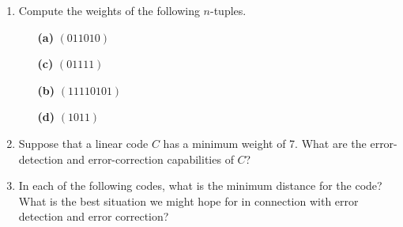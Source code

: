 {\begin{enumerate}
\begin{minipage}[t]{4.6in}
\begin{minipage}[t]{2.25in}
\begin{itemize}
 
\end{itemize}
\end{minipage}
\end{minipage}
 
\vspace{2pt}        %
 
 
 
 
\bf\item\rm  %
Compute the weights of the following $n$-tuples.
 
\vspace{3pt}        %
 
\hspace{-7pt}
\begin{minipage}[t]{4.6in}
\noindent
\begin{minipage}[t]{2.25in}
\begin{itemize}
 
 \item[{\bf (a)}]
$(011010)$
 
 \item[{\bf (c)}]
$(01111)$
 
\end{itemize}
\end{minipage} \hfill
\begin{minipage}[t]{2.25in}
\begin{itemize}
 
 \item[{\bf (b)}]
$(11110101)$
 
 \item[{\bf (d)}]
$(1011)$
 
\end{itemize}
\end{minipage}
\end{minipage}
 
\vspace{2pt}        %
 
 
 
\bf\item\rm  %
Suppose that a linear code $C$ has a minimum weight of 7. What are the
error-detection and error-correction capabilities of $C$?
 
 
\bf\item\rm
In each of the following codes, what is the minimum distance for the
code? What is the best situation we might hope for in connection with
error detection and error correction? 
\begin{enumerate}
 

\end{enumerate}
\end{enumerate}}
